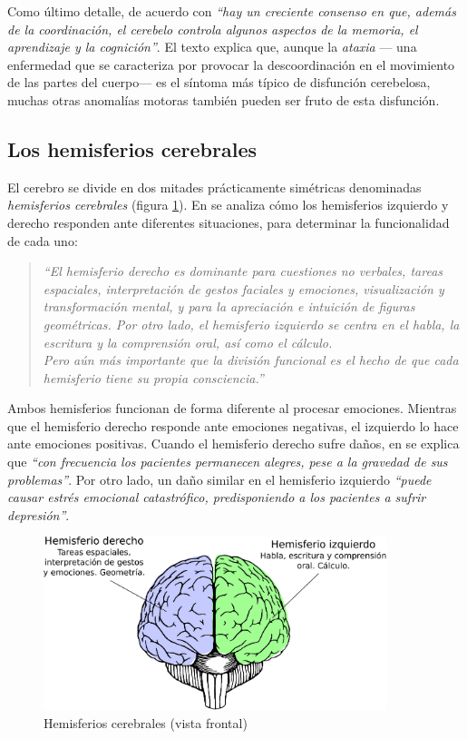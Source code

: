 Como último detalle, de acuerdo con \cite{MerckCo.} {\it ``hay un creciente consenso en que, además de la coordinación, el cerebelo controla algunos aspectos de la memoria, el aprendizaje y la cognición''}. El texto explica que, aunque la  {\it ataxia} --- una enfermedad que se caracteriza por provocar la descoordinación en el movimiento de las partes del cuerpo--- es el síntoma más típico de disfunción cerebelosa, muchas otras anomalías motoras también pueden ser fruto de esta disfunción.



\subsection{Los hemisferios cerebrales}
\label{sec:hemisferios}
El cerebro se divide en dos mitades prácticamente simétricas denominadas {\it hemisferios cerebrales} (figura \ref{hemisferios}). En \cite{Restak1994} se analiza cómo los hemisferios izquierdo y derecho responden ante diferentes situaciones, para determinar la funcionalidad de cada uno:

\begin{quote}
{\it ``El hemisferio derecho es dominante para cuestiones no verbales, tareas espaciales, interpretación de gestos faciales y emociones, visualización y transformación mental, y para la apreciación e intuición de figuras geométricas. Por otro lado, el hemisferio izquierdo se centra en el habla, la escritura y la comprensión oral, así como el cálculo.\\
Pero aún más importante que la división funcional es el hecho de que cada hemisferio tiene su propia consciencia.''}
\end{quote}

Ambos hemisferios funcionan de forma diferente al procesar emociones. Mientras que el hemisferio derecho responde ante emociones negativas, el izquierdo lo hace ante emociones positivas. Cuando el hemisferio derecho sufre daños, en \cite{Panksepp1998} se explica que {\it ``con frecuencia los pacientes permanecen alegres, pese a la gravedad de sus problemas''}. Por otro lado, un daño similar en el hemisferio izquierdo {\it ``puede causar estrés emocional catastrófico, predisponiendo a los pacientes a sufrir depresión''}.

\begin{figure}[h]
  \begin{center}
    \includegraphics[width=10cm]{images/brain2.eps}
    \caption{Hemisferios cerebrales (vista frontal)}
    \label{hemisferios}
  \end{center}
\end{figure}


